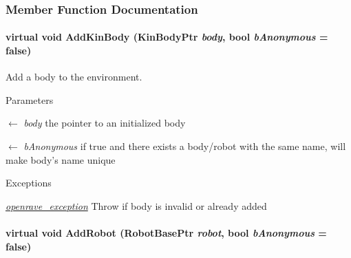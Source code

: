 \subsubsection{Member Function Documentation}
\hypertarget{classOpenRAVE_1_1EnvironmentBase_a979950f27af5a2ce3d8b622cd98b33f5}{
\paragraph[{AddKinBody}]{\setlength{\rightskip}{0pt plus 5cm}virtual void AddKinBody (KinBodyPtr {\em body}, \/  bool {\em bAnonymous} = {\ttfamily false})}\hfill}
\label{classOpenRAVE_1_1EnvironmentBase_a979950f27af5a2ce3d8b622cd98b33f5}


Add a body to the environment. 


\begin{DoxyParams}{Parameters}
\item[\mbox{$\leftarrow$} {\em body}]the pointer to an initialized body \item[\mbox{$\leftarrow$} {\em bAnonymous}]if true and there exists a body/robot with the same name, will make body's name unique \end{DoxyParams}

\begin{DoxyExceptions}{Exceptions}
\item[{\em \hyperlink{classOpenRAVE_1_1openrave__exception}{openrave\_\-exception}}]Throw if body is invalid or already added \end{DoxyExceptions}
\hypertarget{classOpenRAVE_1_1EnvironmentBase_ae16bdfaaed85f17bffd696e17284d359}{
\paragraph[{AddRobot}]{\setlength{\rightskip}{0pt plus 5cm}virtual void AddRobot (RobotBasePtr {\em robot}, \/  bool {\em bAnonymous} = {\ttfamily false})}\hfill}
\label{classOpenRAVE_1_1EnvironmentBase_ae16bdfaaed85f17bffd696e17284d359}


